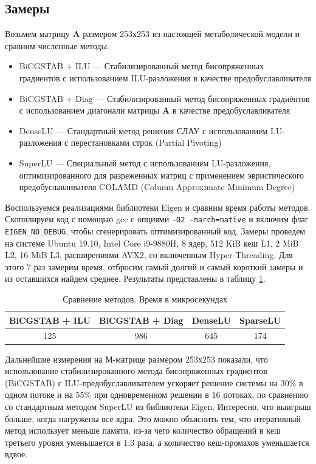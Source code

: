\documentclass[14pt, a4paper]{extreport}
\begin{document}
\subsection{Замеры}
Возьмем матрицу $\mathbf{A}$ размером 253х253 из настоящей метаболической модели и сравним численные методы. 
\begin{itemize}
	\item BiCGSTAB + ILU --- Стабилизированный метод бисопряженных\\градиентов\cite{BiCGSTAB} с использованием ILU-разложения в качестве предобуславливателя
	\item BiCGSTAB + Diag --- Стабилизированный метод бисопряженных градиентов с использованием диагонали матрицы $\mathbf{A}$ в качестве предобуславливателя
	\item DenseLU --- Стандартный метод решения СЛАУ с использованием LU-разложения с перестановками строк (Partial Pivoting)
	\item SuperLU --- Специальный метод с использованием LU-разложения, оптимизированного для разреженных матриц\cite{SuperLU} с применением эвристического предобуславливателя COLAMD (Column Approximate Minimum Degree)\cite{COLAMD}
\end{itemize}
Воспользуемся реализациями библиотеки Eigen и сравним время работы методов. Скопилируем код с помощью gcc с опциями \texttt{-O2 -march=native} и включим флаг \texttt{EIGEN\_NO\_DEBUG}, чтобы сгенерировать оптимизированный код. Замеры проведем на системе Ubuntu 19.10, Intel Core i9-9880H, 8 ядер, 512 KiB кеш L1, 2 MiB L2, 16 MiB L3, расширениями AVX2, со включенным Hyper-Threading. Для этого 7 раз замерим время, отбросим самый долгий и самый короткий замеры и из оставшихся найдем среднее. Результаты представлены в таблицу \ref{methods_benchmark}.

\begin{table}[b]
	\centering
	\caption{Сравнение методов. Время в микросекундах\label{methods_benchmark}}
	\begin{tabular}{c|c|c|c}
		\hline
		BiCGSTAB + ILU & BiCGSTAB + Diag & DenseLU & SparseLU\\
		\hline
		125 & 986 & 645 & 174\\
	\end{tabular}
\end{table}

Дальнейшие измерения на М-матрице размером 253х253 показали, что использование стабилизированного метода бисопряженных градиентов\\(BiCGSTAB) с ILU-предобуславливателем ускоряет решение системы на 30\% в одном потоке и на 55\% при одновременном решении в 16 потоках, по сравнению со стандартным методом SuperLU из библиотеки Eigen. Интересно, что выигрыш больше, когда нагружены все ядра. Это можно объяснить тем, что итеративный метод использует меньше памяти, из-за чего количество обращений в кеш третьего уровня уменьшается в $1.3$ раза, а количество кеш-промахов уменьшается вдвое. 
\end{document}
